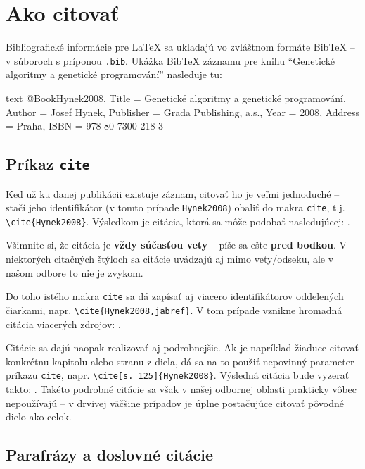 \chapter{Ako citovať}

Bibliografické informácie pre LaTeX sa ukladajú vo zvláštnom formáte BibTeX -- v súboroch s príponou \texttt{.bib}. Ukážka BibTeX záznamu pre knihu \enquote{Genetické algoritmy a genetické programování} nasleduje tu:

\begin{inlinecode}{text}
@Book{Hynek2008,
  Title                    = {Genetické algoritmy a genetické programování},
  Author                   = {Josef Hynek},
  Publisher                = {Grada Publishing, a.s.},
  Year                     = {2008},
  Address                  = {Praha},
  ISBN                     = {978-80-7300-218-3}
}
\end{inlinecode}

\section{Príkaz \texttt{cite}}

Keď už ku danej publikácii existuje záznam, citovať ho je veľmi jednoduché -- stačí jeho identifikátor (v tomto prípade \texttt{Hynek2008}) obaliť do makra \texttt{cite}, t.j. \texttt{{\textbackslash}cite\{Hynek2008\}}. Výsledkom je citácia, ktorá sa môže podobať nasledujúcej: \cite{Hynek2008}.

Všimnite si, že citácia je \textbf{vždy súčasťou vety} -- píše sa ešte \textbf{pred bodkou}. V niektorých citačných štýloch sa citácie uvádzajú aj mimo vety/odseku, ale v našom odbore to nie je zvykom.

Do toho istého makra \texttt{cite} sa dá zapísať aj viacero identifikátorov oddelených čiarkami, napr. \texttt{{\textbackslash}cite\{Hynek2008,jabref\}}. V tom prípade vznikne hromadná citácia viacerých zdrojov: \cite{Hynek2008,jabref}.

Citácie sa dajú naopak realizovať aj podrobnejšie. Ak je napríklad žiaduce citovať konkrétnu kapitolu alebo stranu z diela, dá sa na to použiť nepovinný parameter príkazu \texttt{cite}, napr. \texttt{{\textbackslash}cite[s. 125]\{Hynek2008\}}. Výsledná citácia bude vyzerať takto: \cite[s. 125]{Hynek2008}. Takéto podrobné citácie sa však v našej odbornej oblasti prakticky vôbec nepoužívajú -- v drvivej väčšine prípadov je úplne postačujúce citovať pôvodné dielo ako celok.

\section{Parafrázy a doslovné citácie}

